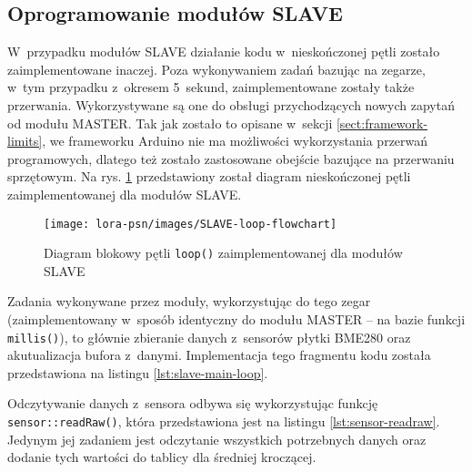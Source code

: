 

\FloatBarrier
\subsection{Oprogramowanie modułów SLAVE\label{sect:firmware-slave}} W~przypadku modułów SLAVE działanie kodu
w~nieskończonej pętli zostało zaimplementowane inaczej. Poza wykonywaniem zadań bazując na zegarze, w~tym przypadku
z~okresem 5~sekund, zaimplementowane zostały także przerwania. Wykorzystywane są one do obsługi przychodzących nowych
zapytań od modułu MASTER. Tak jak zostało to opisane w~sekcji \ref{sect:framework-limits}, we frameworku Arduino nie ma
możliwości wykorzystania przerwań programowych, dlatego też zostało zastosowane obejście bazujące na przerwaniu
sprzętowym. Na rys. \ref{img:slave-flowchart} przedstawiony został diagram nieskończonej pętli zaimplementowanej dla
modułów SLAVE.

\begin{figure}[!htbp]
    \centering
    \texttt{[image: lora-psn/images/SLAVE-loop-flowchart]}
    \caption{\label{img:slave-flowchart}Diagram blokowy pętli \texttt{loop()} zaimplementowanej dla modułów SLAVE}
\end{figure}


Zadania wykonywane przez moduły, wykorzystując do tego zegar (zaimplementowany w~sposób identyczny do modułu MASTER --
na bazie funkcji \texttt{millis()}), to głównie zbieranie danych z~sensorów płytki BME280 oraz akutualizacja bufora
z~danymi. Implementacja tego fragmentu kodu została przedstawiona na listingu \ref{lst:slave-main-loop}.



Odczytywanie danych z~sensora odbywa się wykorzystując funkcję \texttt{sensor::readRaw()}, która przedstawiona jest na
listingu \ref{lst:sensor-readraw}. Jedynym jej zadaniem jest odczytanie wszystkich potrzebnych danych oraz dodanie tych
wartości do tablicy dla średniej kroczącej.



